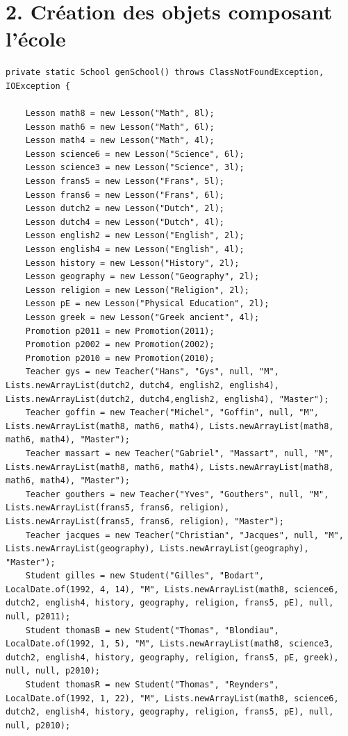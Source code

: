 \documentclass[a4paper,fleqn,12pt,oneside]{report}
\begin{document}
\section*{2. Création des objets composant l'école}

\begin{lstlisting}
private static School genSchool() throws ClassNotFoundException, IOException {

    Lesson math8 = new Lesson("Math", 8l);
    Lesson math6 = new Lesson("Math", 6l);
    Lesson math4 = new Lesson("Math", 4l);
    Lesson science6 = new Lesson("Science", 6l);
    Lesson science3 = new Lesson("Science", 3l);
    Lesson frans5 = new Lesson("Frans", 5l);
    Lesson frans6 = new Lesson("Frans", 6l);
    Lesson dutch2 = new Lesson("Dutch", 2l);
    Lesson dutch4 = new Lesson("Dutch", 4l);
    Lesson english2 = new Lesson("English", 2l);
    Lesson english4 = new Lesson("English", 4l);
    Lesson history = new Lesson("History", 2l);
    Lesson geography = new Lesson("Geography", 2l);
    Lesson religion = new Lesson("Religion", 2l);
    Lesson pE = new Lesson("Physical Education", 2l);
    Lesson greek = new Lesson("Greek ancient", 4l);
    Promotion p2011 = new Promotion(2011);
    Promotion p2002 = new Promotion(2002);
    Promotion p2010 = new Promotion(2010);
    Teacher gys = new Teacher("Hans", "Gys", null, "M", Lists.newArrayList(dutch2, dutch4, english2, english4), Lists.newArrayList(dutch2, dutch4,english2, english4), "Master");
    Teacher goffin = new Teacher("Michel", "Goffin", null, "M", Lists.newArrayList(math8, math6, math4), Lists.newArrayList(math8, math6, math4), "Master");
    Teacher massart = new Teacher("Gabriel", "Massart", null, "M", Lists.newArrayList(math8, math6, math4), Lists.newArrayList(math8, math6, math4), "Master");
    Teacher gouthers = new Teacher("Yves", "Gouthers", null, "M", Lists.newArrayList(frans5, frans6, religion), Lists.newArrayList(frans5, frans6, religion), "Master");
    Teacher jacques = new Teacher("Christian", "Jacques", null, "M", Lists.newArrayList(geography), Lists.newArrayList(geography), "Master");
    Student gilles = new Student("Gilles", "Bodart", LocalDate.of(1992, 4, 14), "M", Lists.newArrayList(math8, science6, dutch2, english4, history, geography, religion, frans5, pE), null, null, p2011);
    Student thomasB = new Student("Thomas", "Blondiau", LocalDate.of(1992, 1, 5), "M", Lists.newArrayList(math8, science3, dutch2, english4, history, geography, religion, frans5, pE, greek), null, null, p2010);
    Student thomasR = new Student("Thomas", "Reynders", LocalDate.of(1992, 1, 22), "M", Lists.newArrayList(math8, science6, dutch2, english4, history, geography, religion, frans5, pE), null, null, p2010);

\end{lstlisting}
\end{document}
